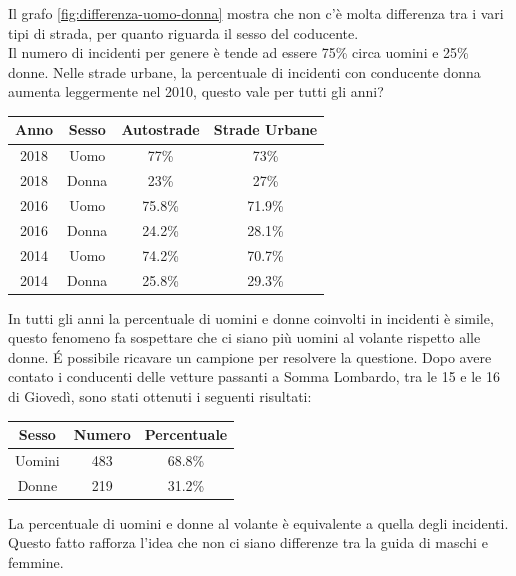 \documentclass[a4paper]{report}
\begin{document}
Il grafo \ref{fig:differenza-uomo-donna} mostra che non c'è molta differenza tra i vari tipi di 
strada, per quanto riguarda il sesso del coducente.\\
Il numero di incidenti per genere è tende ad essere 75\% circa uomini e 25\% donne.
Nelle strade  urbane, la percentuale di incidenti con conducente donna aumenta leggermente nel 2010, 
questo vale per tutti gli anni?

\begin{center}
    \def\arraystretch{1.5}%
    \begin{tabular}{ |c|c|c|c| }
        \hline
        Anno & Sesso & Autostrade & Strade Urbane \\ 
        \hline
        \rowcolor{TableGray}
        2018 & Uomo & 77\%  & 73\% \\
        2018 & Donna & 23\% & 27\% \\
        \rowcolor{TableGray}
        2016 & Uomo & 75.8\%  & 71.9\% \\
        2016 & Donna & 24.2\% & 28.1\% \\
        \rowcolor{TableGray}
        2014 & Uomo & 74.2\%  & 70.7\% \\
        2014 & Donna & 25.8\% & 29.3\% \\
        \hline
    \end{tabular}
\end{center}

In tutti gli anni la percentuale di uomini e donne coinvolti in incidenti è simile, 
questo fenomeno fa sospettare che ci siano più uomini al volante rispetto alle donne.
\'E possibile ricavare un campione per resolvere la questione. 
Dopo avere contato i conducenti delle vetture passanti a Somma Lombardo, tra le 15 e le 16 
di Giovedì, sono stati ottenuti i seguenti risultati:

\begin{center}
    \def\arraystretch{1.5}%
    \begin{tabular}{ |c|c|c| }
        \hline
        Sesso & Numero & Percentuale \\ 
        \hline
        \rowcolor{TableGray}
        Uomini & 483 & 68.8\% \\
        Donne & 219 & 31.2\% \\
        \hline
    \end{tabular}
\end{center}

La percentuale di uomini e donne al volante è equivalente a quella degli incidenti.
Questo fatto rafforza l'idea che non ci siano differenze tra la guida di maschi e femmine.
\end{document}
